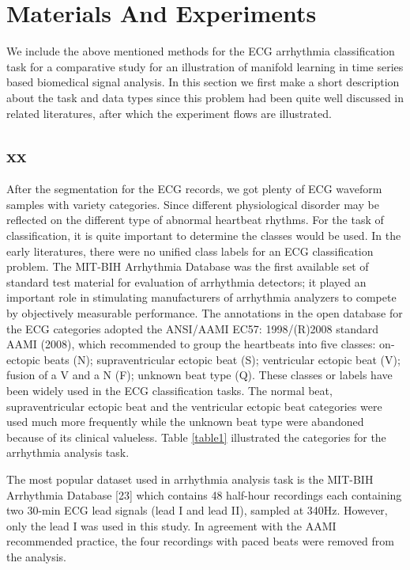 \documentclass[journal]{IEEEtran}
\begin{document}
\lipsum[1-2]


\section{Materials And Experiments}
We include the above mentioned methods for the ECG arrhythmia classification task for a comparative study for an illustration of manifold learning in time series based biomedical signal analysis.
In this section we first make a short description about the task and data types since this problem had been quite well discussed in related literatures, after which the experiment flows are illustrated.

\subsection{xx}

%
%

After the segmentation for the ECG records, we got plenty of ECG waveform samples with variety categories. 
Since different physiological disorder may be reflected on the different type of abnormal heartbeat rhythms. 
For the task of classification, it is quite important to determine the classes would be used. 
In the early literatures, there were no unified class labels for an ECG classification problem. 
The MIT-BIH Arrhythmia Database was the first available set of standard test material for evaluation of arrhythmia detectors; it played an important role in stimulating manufacturers of arrhythmia analyzers to compete by objectively measurable performance. 
The annotations in the open database for the ECG categories adopted the ANSI/AAMI EC57: 1998/(R)2008 standard AAMI (2008), which recommended to group the heartbeats into five classes: on-ectopic beats (N); supraventricular ectopic beat (S); ventricular ectopic beat (V); fusion of a V and a N (F); unknown beat type (Q). These classes or labels have been widely used in the ECG classification tasks. 
The normal beat, supraventricular ectopic beat and the ventricular ectopic beat categories were used much more frequently while the unknown beat type were abandoned because of its clinical valueless.
Table \ref{table1} illustrated the categories for the arrhythmia analysis task.

The most popular dataset used in arrhythmia analysis task is the MIT-BIH Arrhythmia Database [23] which contains 48 half-hour recordings each containing two 30-min ECG lead signals (lead I and lead II), sampled at 340Hz. 
However, only the lead I was used in this study. 
In agreement with the AAMI recommended practice, the four recordings with paced beats were removed from the analysis. 
\end{document}
